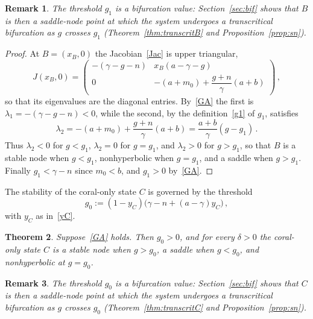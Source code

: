 \documentclass[reqno,11pt]{amsart}
\newtheorem{thm}{Theorem}[section]
\newtheorem{rem}[thm]{Remark}
\numberwithin{equation}{section}
\begin{document}
\begin{rem}
The threshold $g_1$ is a bifurcation value: Section~\ref{sec:bif} shows that $B$ is then a saddle-node point at which the system undergoes a transcritical bifurcation as $g$ crosses $g_1$ (Theorem~\ref{thm:transcritB} and Proposition~\ref{prop:sn}).
\end{rem}

\begin{proof}
At $B=(x_B,0)$ the Jacobian~\eqref{Jac} is upper triangular,
\[
J(x_B,0)=\begin{pmatrix}-(\gamma-g-n) & x_B(a-\gamma-g)\\[3pt] 0 & -(a+m_0)+\dfrac{g+n}{\gamma}(a+b)\end{pmatrix}\,,
\]
so that its eigenvalues are the diagonal entries. By~\eqref{GA} the first is $\lambda_1=-(\gamma-g-n)<0$, while the second, by the definition~\eqref{g1} of $g_1$, satisfies
\[
\lambda_2=-(a+m_0)+\frac{g+n}{\gamma}(a+b)=\frac{a+b}{\gamma}(g-g_1)\,.
\]
Thus $\lambda_2<0$ for $g<g_1$, $\lambda_2=0$ for $g=g_1$, and $\lambda_2>0$ for $g>g_1$, so that $B$ is a stable node when $g<g_1$, nonhyperbolic when $g=g_1$, and a saddle when $g>g_1$. Finally $g_1<\gamma-n$ since $m_0<b$, and $g_1>0$ by~\eqref{GA}.
\end{proof}

The stability of the coral-only state $C$ is governed by the threshold
\begin{equation}\label{g0}
g_0:=(1-y_C)\big(\gamma-n+(a-\gamma)y_C\big)\,,
\end{equation}
with $y_C$ as in~\eqref{yC}.

\begin{thm}\label{thm:stabC}
Suppose~\eqref{GA} holds. Then $g_0>0$, and for every $\delta>0$ the coral-only state $C$ is a stable node when $g>g_0$, a saddle when $g<g_0$, and nonhyperbolic at $g=g_0$.
\end{thm}

\begin{rem}
The threshold $g_0$ is a bifurcation value: Section~\ref{sec:bif} shows that $C$ is then a saddle-node point at which the system undergoes a transcritical bifurcation as $g$ crosses $g_0$ (Theorem~\ref{thm:transcritC} and Proposition~\ref{prop:sn}).
\end{rem}
\end{document}

